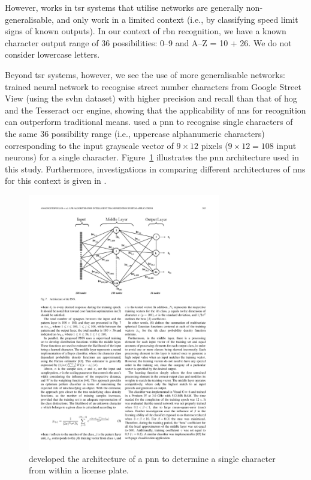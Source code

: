 However, works in \gls{tsr} systems that utilise networks are generally non-generalisable, and only work in a limited context (i.e., by classifying speed limit signs of known outputs). In our context of \gls{rbn} recognition, we have a known character output range of 36 possibilities: 0--9 and A--Z = 10 + 26. We do not consider lowercase letters.

Beyond \gls{tsr} systems, however, we see the use of more generalisable networks: \citet{Netzer:2011to} trained neural network to recognise street number characters from Google Street View (using the \gls{svhn} dataset) with higher precision and recall than that of \gls{hog} and the Tesseract \gls{ocr} engine, showing that the applicability of \glspl{nn} for recognition can outperform traditional means. \citet{Anagnostopoulos:2006wv} used a \gls{pnn} to recognise single characters of the same 36 possibility range (i.e., uppercase alphanumeric characters) corresponding to the input grayscale vector of $9 \times 12$ pixels ($9 \times 12 = 108$ input neurons) for a single character. Figure~\ref{fig:background:recognition:anagnostopoulos2006_nn} illustrates the \gls{pnn} architecture used in this study. Furthermore, investigations in comparing different architectures of \glspl{nn} for this context is given in \citet{Lee:2016uy}.

\begin{figure}[h]
  \centering
  \includegraphics[width=0.75\textwidth]{images/background/anagnostopoulos2006_nn}
  \caption[A PNN used to recognise license plate characters]{\citet{Anagnostopoulos:2006wv} developed the architecture of a \gls{pnn} to determine a single character from within a license plate.}
  \label{fig:background:recognition:anagnostopoulos2006_nn}
\end{figure}


